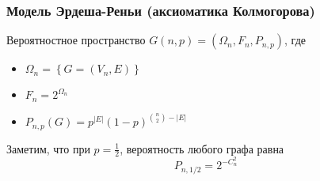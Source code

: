 \frametitle{Модель Эрдеша-Реньи (аксиоматика Колмогорова)} 


\begin{rdefinition}   
    Вероятностное пространство $G(n, p) = \left(\Omega_n, F_n, P_{n, p}\right)$, где \\
    \begin{itemize}
        \item $\Omega_n = \left\{G = \left(V_n, E\right)\right\}$
        \item $F_n = 2^{\Omega_n}$
        \item $P_{n, p}\left(G\right) = p^{|E|}(1-p)^{\binom{n}{2} - |E|}$
    \end{itemize}
\end{rdefinition}

Заметим, что при $p = \frac{1}{2}$, вероятность любого графа равна 
\[
    P_{n, 1/2} = 2^{-C_{n}^{2}}
\]
